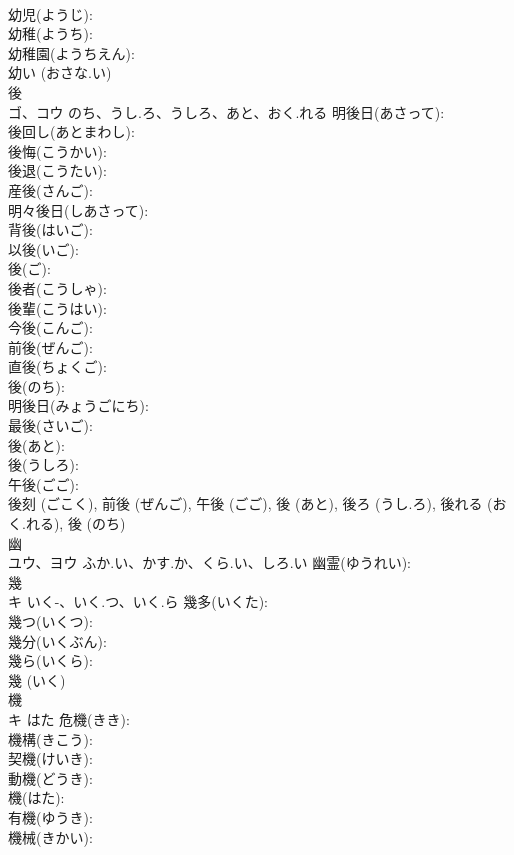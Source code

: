 \documentclass[8pt]{extreport}
\begin{document}
\begin{CJK}{UTF8}{min}
\\	幼児(ようじ): 
\\	幼稚(ようち): 
\\	幼稚園(ようちえん): 
\\	幼い (おさな.い)
\\	後			
\\	ゴ、コウ	のち、うし.ろ、うしろ、あと、おく.れる	明後日(あさって): 
\\	後回し(あとまわし): 
\\	後悔(こうかい): 
\\	後退(こうたい): 
\\	産後(さんご): 
\\	明々後日(しあさって): 
\\	背後(はいご): 
\\	以後(いご): 
\\	後(ご): 
\\	後者(こうしゃ): 
\\	後輩(こうはい): 
\\	今後(こんご): 
\\	前後(ぜんご): 
\\	直後(ちょくご): 
\\	後(のち): 
\\	明後日(みょうごにち): 
\\	最後(さいご): 
\\	後(あと): 
\\	後(うしろ): 
\\	午後(ごご): 
\\	後刻 (ごこく), 前後 (ぜんご), 午後 (ごご), 後 (あと), 後ろ (うし.ろ), 後れる (おく.れる), 後 (のち)
\\	幽			
\\	ユウ、ヨウ	ふか.い、かす.か、くら.い、しろ.い	幽霊(ゆうれい): 
\\	幾			
\\	キ	いく-、いく.つ、いく.ら	幾多(いくた): 
\\	幾つ(いくつ): 
\\	幾分(いくぶん): 
\\	幾ら(いくら): 
\\	幾 (いく)
\\	機			
\\	キ	はた	危機(きき): 
\\	機構(きこう): 
\\	契機(けいき): 
\\	動機(どうき): 
\\	機(はた): 
\\	有機(ゆうき): 
\\	機械(きかい): 

\end{CJK}
\end{document}
